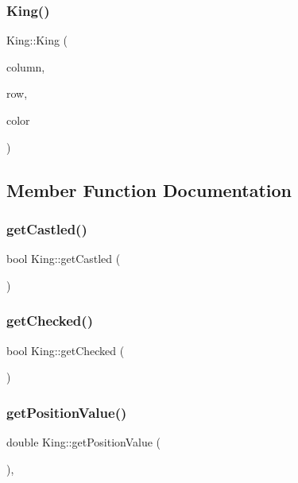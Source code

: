 \subsubsection{\texorpdfstring{King()}{King()}}
{\footnotesize\ttfamily King\+::\+King (\begin{DoxyParamCaption}\item[{int}]{column,  }\item[{int}]{row,  }\item[{\hyperlink{_piece_8h_ad7595c48bb74c0dd2a7648712a2d4985}{Piece\+Color}}]{color }\end{DoxyParamCaption})\hspace{0.3cm}{\ttfamily [inline]}}



\subsection{Member Function Documentation}
\mbox{\label{class_king_a7f58cb2d7d005f03d229af195136b00a}} 
\subsubsection{\texorpdfstring{get\+Castled()}{getCastled()}}
{\footnotesize\ttfamily bool King\+::get\+Castled (\begin{DoxyParamCaption}{ }\end{DoxyParamCaption})}

\mbox{\label{class_king_aecc7387c9b2d6e94b556d416b985b210}} 
\subsubsection{\texorpdfstring{get\+Checked()}{getChecked()}}
{\footnotesize\ttfamily bool King\+::get\+Checked (\begin{DoxyParamCaption}{ }\end{DoxyParamCaption})}

\mbox{\label{class_king_a047413f5f6df784b2fd308f20e356ea4}} 
\subsubsection{\texorpdfstring{get\+Position\+Value()}{getPositionValue()}}
{\footnotesize\ttfamily double King\+::get\+Position\+Value (\begin{DoxyParamCaption}{ }\end{DoxyParamCaption})\hspace{0.3cm}{\ttfamily [override]}, {\ttfamily [virtual]}}



